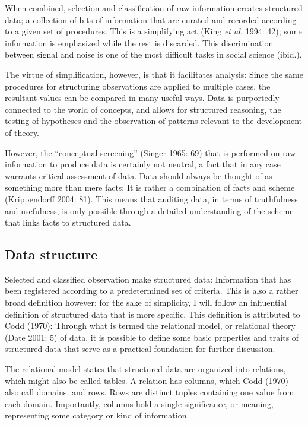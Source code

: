 \documentclass[12pt,twoside]{reedthesis}
\begin{document}
When combined, selection and classification of raw information creates
structured data; a collection of bits of information that are curated
and recorded according to a given set of procedures. This is a
simplifying act (King \emph{et al.} 1994: 42); some information is
emphasized while the rest is discarded. This discrimination between
signal and noise is one of the most difficult tasks in social science
(ibid.).

The virtue of simplification, however, is that it facilitates analysis:
Since the same procedures for structuring observations are applied to
multiple cases, the resultant values can be compared in many useful
ways. Data is purportedly connected to the world of concepts, and allows
for structured reasoning, the testing of hypotheses and the observation
of patterns relevant to the development of theory.

However, the ``conceptual screening'' (Singer 1965: 69) that is
performed on raw information to produce data is certainly not neutral, a
fact that in any case warrants critical assessment of data. Data should
always be thought of as something more than mere facts: It is rather a
combination of facts and scheme (Krippendorff 2004: 81). This means that
auditing data, in terms of truthfulness and usefulness, is only possible
through a detailed understanding of the scheme that links facts to
structured data.

\subsection{Data structure}\label{data-structure}

Selected and classified observation make structured data: Information
that has been registered according to a predetermined set of criteria.
This is also a rather broad definition however; for the sake of
simplicity, I will follow an influential definition of structured data
that is more specific. This definition is attributed to Codd (1970):
Through what is termed the relational model, or relational theory (Date
2001: 5) of data, it is possible to define some basic properties and
traits of structured data that serve as a practical foundation for
further discussion.

The relational model states that structured data are organized into
relations, which might also be called tables. A relation has columns,
which Codd (1970) also call domains, and rows. Rows are distinct tuples
containing one value from each domain. Importantly, columns hold a
single significance, or meaning, representing some category or kind of
information.
\end{document}
